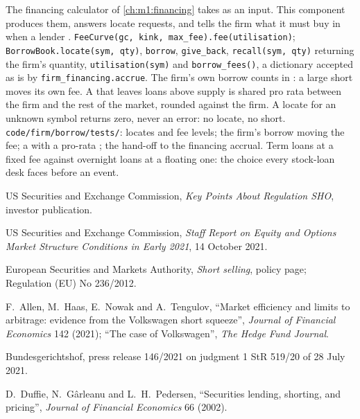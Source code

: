\begin{build}
 The financing calculator of \cref{ch:m1:financing} takes
 as an input. This component produces them, answers locate
requests, and tells the firm what it must buy in when a lender .
 \texttt{FeeCurve(gc, kink, max\_fee).fee(utilisation)};
\texttt{BorrowBook.locate(sym, qty)}, \texttt{borrow}, \texttt{give\_back},
\texttt{recall(sym, qty)} returning the firm's  quantity,
\texttt{utilisation(sym)} and \texttt{borrow\_fees()}, a dictionary accepted
as is by \texttt{firm\_financing.accrue}.
 The firm's own borrow counts in : a large short
moves its own fee. A  that leaves loans above supply is shared pro rata
between the firm and the rest of the market, rounded against the firm. A
locate for an unknown symbol returns zero, never an error: no locate, no
short.
 \texttt{code/firm/borrow/tests/}: locates and fee
levels; the firm's borrow moving the fee; a  with a pro-rata ;
the hand-off to the financing accrual.
 Term loans at a fixed fee against overnight loans at a
floating one: the choice every stock-loan desk faces before an event.
\end{build}

\begin{omsources}
\item US Securities and Exchange Commission, \emph{Key Points About
Regulation SHO}, investor publication.
\item US Securities and Exchange Commission, \emph{Staff Report on Equity and
Options Market Structure Conditions in Early 2021}, 14 October 2021.
\item European Securities and Markets Authority, \emph{Short selling}, policy
page; Regulation (EU) No 236/2012.
\item F.~Allen, M.~Haas, E.~Nowak and A.~Tengulov, ``Market efficiency and
limits to arbitrage: evidence from the Volkswagen short squeeze'',
\emph{Journal of Financial Economics} 142 (2021); ``The case of Volkswagen'',
\emph{The Hedge Fund Journal}.
\item Bundesgerichtshof, press release 146/2021 on judgment 1 StR 519/20 of
28 July 2021.
\item D.~Duffie, N.~G\^arleanu and L.~H.~Pedersen, ``Securities lending,
shorting, and pricing'', \emph{Journal of Financial Economics} 66 (2002).
\end{omsources}

